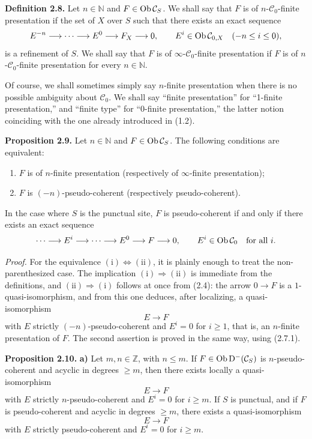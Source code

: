 \documentclass[11pt]{article}
\begin{document}
\textbf{Definition 2.8.} Let \(n\in\mathbb N\) and \(F\in\operatorname{Ob}\mathcal C_S\). We shall say that \(F\) is of \(n\)-\(\mathcal C_0\)-finite presentation if the set of \(X\) over \(S\) such that there exists an exact sequence
\[
  E^{-n}\longrightarrow\cdots\longrightarrow E^0\longrightarrow F_X\longrightarrow 0,
\qquad E^i\in\operatorname{Ob}\mathcal C_{0,X}\quad(-n\leq i\leq 0),
\]
is a refinement of \(S\). We shall say that \(F\) is of \(\infty\)-\(\mathcal C_0\)-finite presentation if \(F\) is of \(n\)-\(\mathcal C_0\)-finite presentation for every \(n\in\mathbb N\).

Of course, we shall sometimes simply say \(n\)-finite presentation when there is no possible ambiguity about \(\mathcal C_0\). We shall say ``finite presentation'' for ``1-finite presentation,'' and ``finite type'' for ``0-finite presentation,'' the latter notion coinciding with the one already introduced in (1.2).

\textbf{Proposition 2.9.} Let \(n\in\mathbb N\) and \(F\in\operatorname{Ob}\mathcal C_S\). The following conditions are equivalent:
\begin{enumerate}[label=(\roman*)]
\item \(F\) is of \(n\)-finite presentation (respectively of \(\infty\)-finite presentation);
\item \(F\) is \((-n)\)-pseudo-coherent (respectively pseudo-coherent).
\end{enumerate}
In the case where \(S\) is the punctual site, \(F\) is pseudo-coherent if and only if there exists an exact sequence
\[
  \cdots\longrightarrow E^i\longrightarrow\cdots\longrightarrow E^0\longrightarrow F\longrightarrow 0,
\qquad E^i\in\operatorname{Ob}\mathcal C_0\quad\text{for all }i.
\]

\emph{Proof.} For the equivalence \((\mathrm{i})\Leftrightarrow(\mathrm{ii})\), it is plainly enough to treat the non-parenthesized case. The implication \((\mathrm{i})\Rightarrow(\mathrm{ii})\) is immediate from the definitions, and \((\mathrm{ii})\Rightarrow(\mathrm{i})\) follows at once from (2.4): the arrow \(0\to F\) is a \(1\)-quasi-isomorphism, and from this one deduces, after localizing, a quasi-isomorphism
\[
  E\longrightarrow F
\]
with \(E\) strictly \((-n)\)-pseudo-coherent and \(E^i=0\) for \(i\geq 1\), that is, an \(n\)-finite presentation of \(F\). The second assertion is proved in the same way, using (2.7.1).

\textbf{Proposition 2.10.} \textbf{a)} Let \(m,n\in\mathbb Z\), with \(n\leq m\). If \(F\in\operatorname{Ob}\mathrm D^-(\mathcal C_S)\) is \(n\)-pseudo-coherent and acyclic in degrees \(\geq m\), then there exists locally a quasi-isomorphism
\[
  E\longrightarrow F
\]
with \(E\) strictly \(n\)-pseudo-coherent and \(E^i=0\) for \(i\geq m\). If \(S\) is punctual, and if \(F\) is pseudo-coherent and acyclic in degrees \(\geq m\), there exists a quasi-isomorphism
\[
  E\longrightarrow F
\]
with \(E\) strictly pseudo-coherent and \(E^i=0\) for \(i\geq m\).
\end{document}
